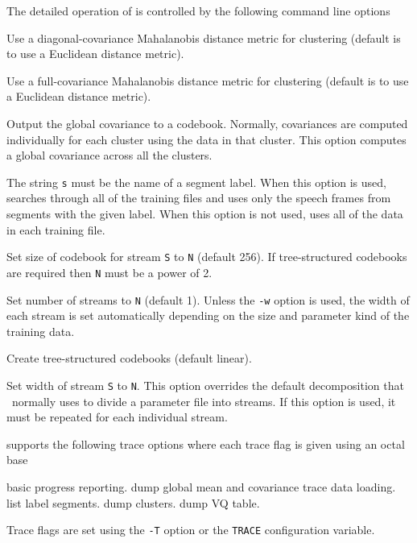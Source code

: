 The detailed operation of  is controlled by the following
command line options
\begin{optlist}
    Use a diagonal-covariance Mahalanobis distance metric for
 clustering (default is to use a Euclidean distance metric).

    Use a full-covariance Mahalanobis distance metric for
 clustering (default is to use a Euclidean distance metric).

    Output the global covariance to a codebook.  Normally,
     covariances are computed individually for each cluster using
     the data in that cluster.  This option computes a global covariance
     across all the clusters.

   The string {\tt s} must be the name of a
      segment label.  When this option is used,  searches
      through all of the training files and uses only the speech
      frames from segments with the given label.  When this option is not 
      used,  uses all of the data in each training file.

   Set size of codebook for stream \texttt{S} 
       to \texttt{N} (default 256).
   If tree-structured codebooks are required then \texttt{N} 
   must be a power of 2.
  
   Set number of streams to \texttt{N} (default 1).
    Unless the \texttt{-w} option is used, the width of each stream
    is set automatically depending on the size and parameter kind of the 
    training data.

    Create tree-structured codebooks (default linear).
  
   Set width of stream \texttt{S} to \texttt{N}.
  This option overrides the default decomposition that \HTK\ normally
  uses to divide a parameter file into streams.  If this option is used,
  it must be repeated for each individual stream.
  
\stdoptF
\stdoptG
\stdoptI
\stdoptL
\stdoptX
\end{optlist}

 supports the following trace options where each
trace flag is given using an octal base
\begin{optlist}
    basic progress reporting.
    dump global mean and covariance
    trace data loading.
    list label segments.
    dump clusters.
    dump VQ table.
\end{optlist}
Trace flags are set using the \texttt{-T} option or the  \texttt{TRACE} 
configuration variable.



